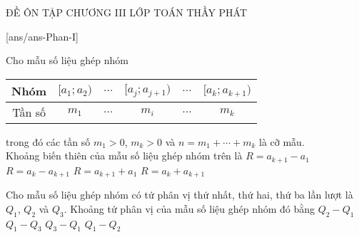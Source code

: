 ﻿\begin{name}
	{\tenchude}
	{ĐỀ ÔN TẬP CHƯƠNG III}
	{LỚP TOÁN THẦY PHÁT}
	{\thoigian}
\end{name}
\TN
{}[ans/ans\currfilebase-Phan-I]
\begin{ex}%
 Cho mẫu số liệu ghép nhóm
 \begin{center}
 \begin{tabular}{|c|c|c|c|c|c|}
 \hline
 Nhóm & $[a_1;a_2)$ & $\ldots$ & $[a_j;a_{j+1})$ & $\ldots$ &$[a_k;a_{k+1})$ \\
 \hline
 Tần số & $m_1$ & $\ldots$ & $m_i$ & $\ldots$ & $m_k$ \\
 \hline
 \end{tabular}
 \end{center}
 trong đó các tần số $m_1 > 0$, $m_k > 0$ và $n = m_1 + \cdots + m_k$ là cỡ mẫu.\\
 Khoảng biến thiên của mẫu số liệu ghép nhóm trên là
 \choice
 {\True $R = a_{k+1} - a_1$}
 {$R = a_k - a_{k+1}$}
 {$R = a_{k+1} + a_1$}
 {$R = a_k + a_{k+1}$}
\end{ex}

\begin{ex}%
 Cho mẫu số liệu ghép nhóm có tứ phân vị thứ nhất, thứ hai, thứ ba lần lượt là $Q_1$, $Q_2$ và $Q_3$. Khoảng tứ phân vị của mẫu số liệu ghép nhóm đó bằng
 \choice
 {$Q_2 - Q_1$}
 {$Q_1 - Q_3$}
 {\True $Q_3 - Q_1$}
 {$Q_1 - Q_2$}
\end{ex}

